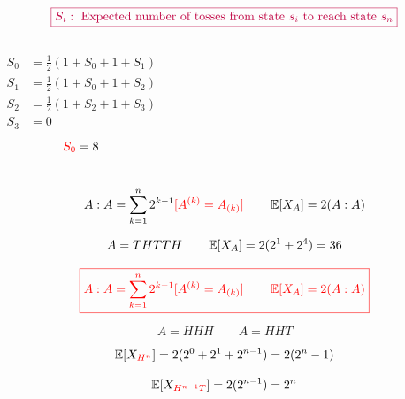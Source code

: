 \begin{frame}{}

  \pause
  \vspace{-0.30cm}
  \[
    \textcolor{purple}{\boxed{S_i: \text{ Expected number of tosses from state $s_i$ to reach state } s_n}}
  \]

  \begin{columns}
      \pause
      \begin{align*}
	S_0 &= \frac{1}{2}(1 + S_0 + 1 + S_1) \\
	S_1 &= \frac{1}{2}(1 + S_0 + 1 + S_2) \\
	S_2 &= \frac{1}{2}(1 + S_2 + 1 + S_3) \\
	S_3 &= 0
      \end{align*}
      \pause
      \[
	\textcolor{red}{S_0} = 8
      \]
  \end{columns}
\end{frame}

\begin{frame}{}


\end{frame}

\begin{frame}{}
  \[
    A : A = \sum_{k=1}^{n} 2^{k-1} \textcolor{red}{[A^{(k)} = A_{(k)}]} \qquad \operatorname*{\mathbb{E}}[X_{A}] = 2 (A : A)
  \]

  \pause
  \vspace{-0.30cm}

  \pause
  \[
    A = THTTH \qquad \operatorname*{\mathbb{E}}[X_A] = 2(2^1 + 2^4) = 36
  \]

\end{frame}

\begin{frame}{}
  \[
    \textcolor{red}{\boxed{A : A = \sum_{k=1}^{n} 2^{k-1} [A^{(k)} = A_{(k)}] \qquad \operatorname*{\mathbb{E}}[X_{A}] = 2 (A : A)}}
  \]

  \pause
  \vspace{0.30cm}
  \[
    A = HHH \qquad A = HHT
  \]

  \pause
  \vspace{0.30cm}
  \[
    \operatorname*{\mathbb{E}}[X_{\textcolor{red}{H^n}}] = 2(2^0 + 2^1 + 2^{n-1}) = 2(2^n - 1)
  \]

  \pause
  \vspace{0.30cm}
  \[
    \operatorname*{\mathbb{E}}[X_{\textcolor{red}{H^{n-1} T}}] = 2(2^{n-1}) = 2^n
  \]
\end{frame}


